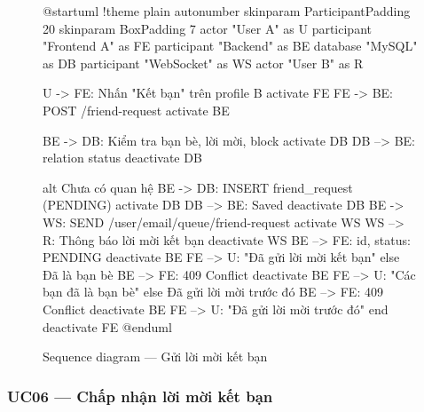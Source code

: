 \documentclass[12pt,a4paper]{report}
\begin{document}
\begin{figure}[H]
    \centering
    \begin{plantuml}
        @startuml
        !theme plain
        autonumber
        skinparam ParticipantPadding 20
        skinparam BoxPadding 7
        actor "User A" as U
        participant "Frontend A" as FE
        participant "Backend" as BE
        database "MySQL" as DB
        participant "WebSocket" as WS
        actor "User B" as R

        U -> FE: Nhấn "Kết bạn" trên profile B
        activate FE
        FE -> BE: POST /friend-request 
        activate BE

        BE -> DB: Kiểm tra bạn bè, lời mời, block
        activate DB
        DB --> BE: { relation status }
        deactivate DB

        alt Chưa có quan hệ
          BE -> DB: INSERT friend_request (PENDING)
          activate DB
          DB --> BE: Saved
          deactivate DB
          BE -> WS: SEND /user/{email}/queue/friend-request
          activate WS
          WS --> R: Thông báo lời mời kết bạn
          deactivate WS
          BE --> FE: { id, status: PENDING }
          deactivate BE
          FE --> U: "Đã gửi lời mời kết bạn"
        else Đã là bạn bè
          BE --> FE: 409 Conflict
          deactivate BE
          FE --> U: "Các bạn đã là bạn bè"
        else Đã gửi lời mời trước đó
          BE --> FE: 409 Conflict
          deactivate BE
          FE --> U: "Đã gửi lời mời trước đó"
        end
        deactivate FE
        @enduml
    \end{plantuml}
    \caption{Sequence diagram --- Gửi lời mời kết bạn}
\end{figure}

\subsubsection{UC06 --- Chấp nhận lời mời kết bạn}
\end{document}
